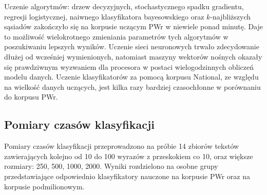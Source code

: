 Uczenie algorytmów: drzew decyzyjnych, stochastycznego spadku gradientu, regresji logistycznej, naiwnego klasyfikatora bayesowskiego oraz $k$-najbliższych sąsiadów zakończyło się na korpusie uczącym PWr w niewiele ponad minutę. Daje to możliwość wielokrotnego zmieniania parametrów tych algorytmów w poszukiwaniu lepszych wyników. Uczenie sieci neuronowych trwało zdecydowanie dłużej od wcześniej wymienionych, natomiast maszyny wektorów nośnych okazały się prawdziwnym wyzwaniem dla procesora w postaci wielogodzinnych obliczeń modelu danych. Uczenie klasyfikatorów za pomocą korpusu National, ze względu na wielkość danych uczących, jest kilka razy bardziej czasochłonne w porównaniu do korpusu PWr.

\subsection{Pomiary czasów klasyfikacji}

Pomiary czasów klasyfikacji przeprowadzono na próbie 14 zbiorów tekstów zawierających kolejno od 10 do 100 wyrazów z przeskokiem co 10, oraz większe rozmiary: 250, 500, 1000, 2000. Wyniki rozdzielono na osobne grupy przedstawiające odpowiednio klasyfikatory nauczone na korpusie PWr oraz na korpusie podmilionowym.

\newpage

